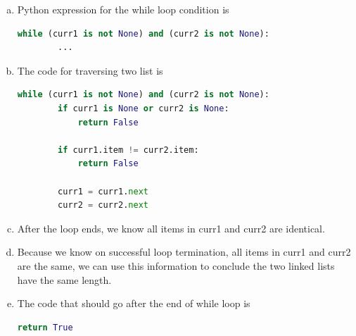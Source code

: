 \documentclass[12pt]{article}
\begin{document}
\begin{enumerate}[a.]
\begin{mdframed}
    \bigskip

    Using this fact, the python expression involving \textit{curr1}
    and \textit{curr2} that expresses the stopping condition is

    \bigskip

    \begin{lstlisting}[language=Python]
    (curr1 is None) or (curr2 is None) # <- Correct Solution
    \end{lstlisting}
    \end{mdframed}

    \item

    Python expression for the while loop condition is

    \begin{lstlisting}[language=Python]
    while (curr1 is not None) and (curr2 is not None):
        ...
    \end{lstlisting}

    \item

    The code for traversing two list is

    \begin{lstlisting}[language=Python]
    while (curr1 is not None) and (curr2 is not None):
        if curr1 is None or curr2 is None:
            return False

        if curr1.item != curr2.item:
            return False

        curr1 = curr1.next
        curr2 = curr2.next
    \end{lstlisting}

    \item

    After the loop ends, we know all items in curr1 and curr2 are identical.

    \item

    Because we know on successful loop termination, all items in curr1 and curr2
    are the same, we can use this information to conclude the two linked lists
    have the same length.

    \item

    The code that should go after the end of while loop is

    \begin{lstlisting}[language=Python]
    return True
    \end{lstlisting}


\end{enumerate}
\end{document}
